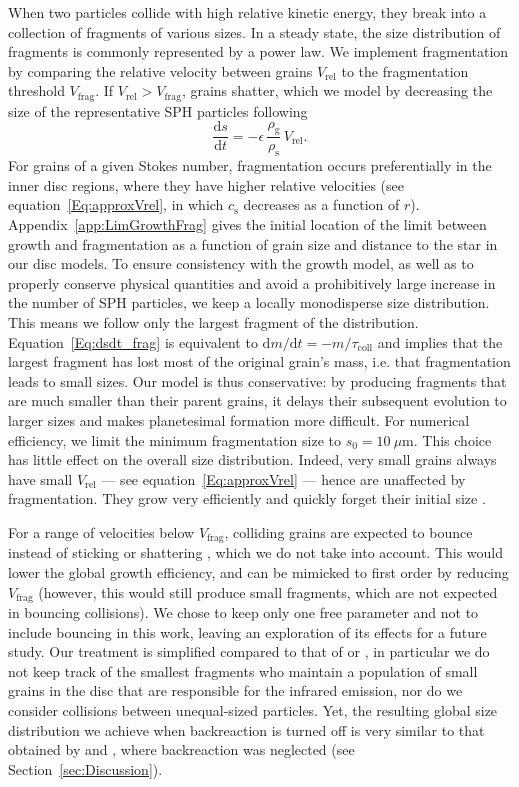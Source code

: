 \documentclass[a4paper,fleqn,usenatbib]{mnras}
\newcommand{\Vrel}{V_\mathrm{rel}}    %
\newcommand{\Vfrag}{V_\mathrm{frag}}  %
\begin{document}
When two particles collide with high relative kinetic energy, they break into a collection of fragments of various sizes. In a steady state, the size distribution of fragments is commonly represented by a power law.
We implement fragmentation by comparing the relative velocity between grains $\Vrel$ to the fragmentation threshold $\Vfrag$. If $\Vrel>\Vfrag$, grains shatter, which we model by decreasing the size of the representative SPH particles
following
\begin{equation}
\frac{\mathrm{d}s}{\mathrm{d}t}=-\epsilon\,\frac{\rho_\mathrm{g}}{\rho_\mathrm{s}}\,\Vrel.
\label{Eq:dsdt_frag}
\end{equation}
For grains of a given Stokes number, fragmentation occurs preferentially in the inner disc regions, where they have higher relative velocities (see equation~\ref{Eq:approxVrel}, in which $c_\mathrm{s}$ decreases as a function of $r$). Appendix~\ref{app:LimGrowthFrag} gives the initial location of the limit between growth and fragmentation as a function of grain size and distance to the star in our disc models. To ensure consistency with the growth model, as well as to properly conserve physical quantities and avoid a prohibitively large increase in the number of SPH particles, we keep a locally monodisperse size distribution. This means we follow only the largest fragment of the distribution. Equation~\ref{Eq:dsdt_frag} is equivalent to $\mathrm{d}m/\mathrm{d}t=-m/\tau_\mathrm{coll}$ and implies that the largest fragment has lost most of the original grain's mass, i.e. that fragmentation leads to small sizes.
Our model is thus conservative: by producing fragments that are much smaller than their parent grains, it delays their subsequent evolution to larger sizes and makes planetesimal formation more difficult.
For numerical efficiency, we limit the minimum fragmentation size to $s_0=10~\mu$m. This choice has little effect on the overall size distribution. Indeed, very small grains always have small $\Vrel$ --- see equation~\ref{Eq:approxVrel} --- hence are unaffected by fragmentation. They grow very efficiently and quickly forget their initial size \citep{Laibe2008}.

For a range of velocities below $\Vfrag$, colliding grains are expected to bounce instead of sticking or shattering \citep{Zsom2010}, which we do not take into account. This would lower the global growth efficiency, and can be mimicked to first order by reducing $\Vfrag$ (however, this would still produce small fragments, which are not expected in bouncing collisions). We chose to keep only one free parameter and not to include bouncing in this work, leaving an exploration of its effects for a future study. Our treatment is simplified compared to that of \citet{Birnstiel2010} or \citet{Garaud2013}, in particular we do not keep track of the smallest fragments who maintain a population of small grains in the disc that are responsible for the infrared emission, nor do we consider collisions between unequal-sized particles. Yet, the resulting global size distribution we achieve when backreaction is turned off is very similar to that obtained by \citet{Brauer2008} and \citet{Birnstiel2010}, where backreaction was neglected (see Section~\ref{sec:Discussion}).
\end{document}
